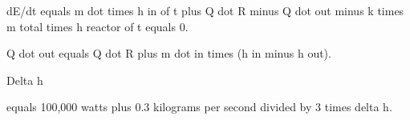 dE/dt equals m dot times h in of t plus Q dot R minus Q dot out minus k times m total times h reactor of t equals 0.  

Q dot out equals Q dot R plus m dot in times (h in minus h out).  

Delta h  

equals 100,000 watts plus 0.3 kilograms per second divided by 3 times delta h.